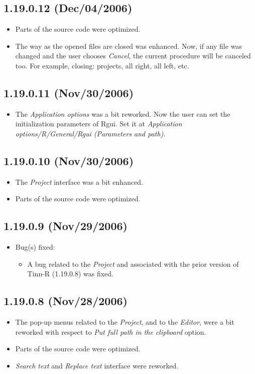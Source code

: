 \subsection*{1.19.0.12 (Dec/04/2006)}
\begin{itemize}
  \item Parts of the source code were optimized.
  \item The way as the opened files are closed was enhanced. Now, if any file
    was changed and the user chooses \textit{Cancel}, the current procedure
    will be canceled too. For example, closing: projects, all right, all left,
    etc.
\end{itemize}


\subsection*{1.19.0.11 (Nov/30/2006)}
\begin{itemize}
  \item The \textit{Application options} was a bit reworked. Now the user can
    set the initialization parameters of Rgui. Set it at \textit{Application
      options/R/General/Rgui (Parameters and path)}.
\end{itemize}


\subsection*{1.19.0.10 (Nov/30/2006)}
\begin{itemize}
  \item The \textit{Project} interface was a bit enhanced.
  \item Parts of the source code were optimized.
\end{itemize}


\subsection*{1.19.0.9 (Nov/29/2006)}
\begin{itemize}
  \item Bug(s) fixed:
    \begin{itemize}
      \item A bug related to the \textit{Project} and associated with the prior
        version of Tinn-R (1.19.0.8) was fixed.
    \end{itemize}
\end{itemize}


\subsection*{1.19.0.8 (Nov/28/2006)}
\begin{itemize}
  \item The pop-up menus related to the \textit{Project}, and to the
    \textit{Editor}, were a bit reworked with respect to \textit{Put
      full path in the clipboard} option.
  \item Parts of the source code were optimized.
  \item \textit{Search text} and \textit{Replace text} interface were
    reworked.
\end{itemize}


